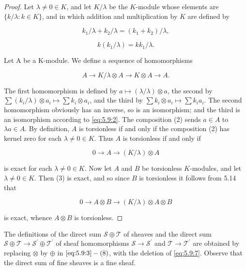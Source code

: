 \begin{proof}
Let $\lambda \neq 0 \in K$, and let $K/\lambda$ be the $K$-module whose elements are $\{k/\lambda: k \in K\}$, and in which addition and multiplication by $K$ are defined by

\begin{equation}
\tag{1}\label{eq:5.40:1}
k_{1}/\lambda+k_{2}/\lambda=(k_{1}+k_{2})/\lambda,
\end{equation}

\[
k(k_{1}/\lambda)=k k_{1}/\lambda.
\]

Let A be a K-module. We define a sequence of homomorphisms

\begin{equation}
\tag{2}\label{eq:5.40:2}
A\to K/\lambda\otimes A\to K\otimes A\to A.
\end{equation}

The first homomorphism is defined by $a \mapsto (\lambda / \lambda) \otimes a$, the second by $\sum (k_i / \lambda) \otimes a_i \mapsto \sum k_i \otimes a_i$, and the third by $\sum k_i \otimes a_i \mapsto \sum k_i a_i$. The second homomorphism obviously has an inverse, so is an isomorphism; and the third is an isomorphism according to \eqref{eq:5.9:2}. The composition (2) sends $a \in A$ to $\lambda a \in A$. By definition, $A$ is torsionless if and only if the composition (2) has kernel zero for each $\lambda \neq 0 \in K$. Thus $A$ is torsionless if and only if

\begin{equation}
\tag{3}\label{eq:5.40:3}
0\to A\to(K/\lambda)\otimes A
\end{equation}

is exact for each $\lambda \neq 0 \in K$. Now let $A$ and $B$ be torsionless $K$-modules, and let $\lambda \neq 0 \in K$. Then (3) is exact, and so since $B$ is torsionless it follows from 5.14 that

\begin{equation}
\tag{4}\label{eq:5.40:4}
0\to A\otimes B\to(K/\lambda)\otimes A\otimes B
\end{equation}

is exact, whence $A\otimes B$ is torsionless.

\end{proof}

\begin{definition}\label{thm:5.41}
The definitions of the direct sum $\mathcal{S}\oplus\mathcal{T}$ of sheaves and the direct sum $\mathcal{S}\oplus\mathcal{T}\to\mathcal{S}^{\prime}\oplus\mathcal{T}^{\prime}$ of sheaf homomorphisms $\mathcal{S}\to\mathcal{S}^{\prime}$ and $\mathcal{T}\to\mathcal{T}^{\prime}$ are obtained by replacing $\otimes$ by $\oplus$ in $\eqref{eq:5.9:3}-(8)$, with the deletion of \eqref{eq:5.9:7}. Observe that the direct sum of fine sheaves is a fine sheaf.
\end{definition}

